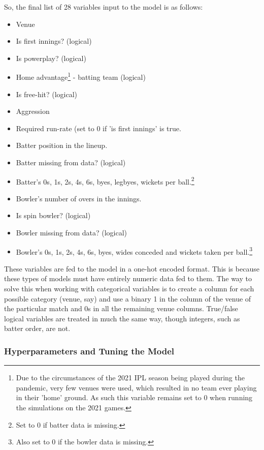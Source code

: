 So, the final list of 28 variables input to the model is as follows:
\begin{itemize}
    \itemsep-0.25em
    \renewcommand\labelitemi{-}
    \item Venue
    \item Is first innings? (logical)
    \item Is powerplay? (logical)
    \item Home advantage\footnote{Due to the circumstances of the 2021 IPL season being played during the pandemic, very few venues were used, which resulted in no team ever playing in their 'home' ground. As such this variable remains set to 0 when running the simulations on the 2021 games.} - batting team (logical)
    \item Is free-hit? (logical)
    \item Aggression
    \item Required run-rate (set to 0 if 'is first innings' is true.
    \item Batter position in the lineup.
    \item Batter missing from data? (logical)
    \item Batter's 0s, 1s, 2s, 4s, 6s, byes, legbyes, wickets per ball.\footnote{Set to 0 if batter data is missing.}
    \item Bowler's number of overs in the innings.
    \item Is spin bowler? (logical)
    \item Bowler missing from data? (logical)
    \item Bowler's 0s, 1s, 2s, 4s, 6s, byes, wides conceded and wickets taken per ball.\footnote{Also set to 0 if the bowler data is missing.}
\end{itemize}

These variables are fed to the model in a one-hot encoded format. This is because these types of models must have entirely numeric data fed to them. The way to solve this when working with categorical variables is to create a column for each possible category (venue, say) and use a binary 1 in the column of the venue of the particular match and 0s in all the remaining venue columns. True/false logical variables are treated in much the same way, though integers, such as batter order, are not.

\subsubsection{Hyperparameters and Tuning the Model}













